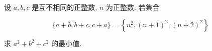 \documentclass[aspectratio=169]{ctexbeamer}
\begin{document}

\begin{frame}
设 $a ,  b ,  c$ 是互不相同的正整数, $n$ 为正整数. 若集合

$$
\{a+b, b+c, c+a\}=\left\{n^{2},(n+1)^{2},(n+2)^{2}\right\}
$$

求 $a^{2}+b^{2}+c^{2}$ 的最小值.
\end{frame}
\end{document}
